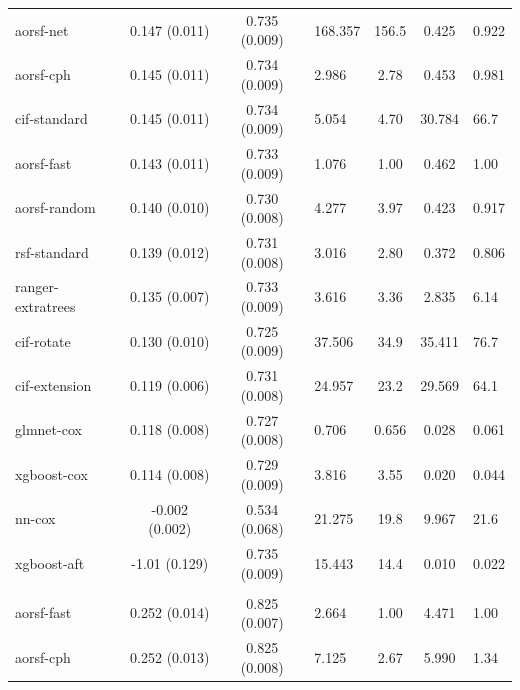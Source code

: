 \documentclass[twoside,11pt]{article}\usepackage[]{graphicx}\usepackage[]{xcolor}
\newenvironment{knitrout}{}{} %
\begin{document}
\begin{knitrout}
\begin{longtable}{lcclccl}
\hspace{1em}aorsf-net & 0.147 (0.011) & 0.735 (0.009) & 168.357 & 156.5 & 0.425 & 0.922\\
\hspace{1em}aorsf-cph & 0.145 (0.011) & 0.734 (0.009) & 2.986 & 2.78 & 0.453 & 0.981\\
\hspace{1em}cif-standard & 0.145 (0.011) & 0.734 (0.009) & 5.054 & 4.70 & 30.784 & 66.7\\
\hspace{1em}aorsf-fast & 0.143 (0.011) & 0.733 (0.009) & 1.076 & 1.00 & 0.462 & 1.00\\
\hspace{1em}aorsf-random & 0.140 (0.010) & 0.730 (0.008) & 4.277 & 3.97 & 0.423 & 0.917\\
\hspace{1em}rsf-standard & 0.139 (0.012) & 0.731 (0.008) & 3.016 & 2.80 & 0.372 & 0.806\\
\hspace{1em}ranger-extratrees & 0.135 (0.007) & 0.733 (0.009) & 3.616 & 3.36 & 2.835 & 6.14\\
\hspace{1em}cif-rotate & 0.130 (0.010) & 0.725 (0.009) & 37.506 & 34.9 & 35.411 & 76.7\\
\hspace{1em}cif-extension & 0.119 (0.006) & 0.731 (0.008) & 24.957 & 23.2 & 29.569 & 64.1\\
\hspace{1em}glmnet-cox & 0.118 (0.008) & 0.727 (0.008) & 0.706 & 0.656 & 0.028 & 0.061\\
\hspace{1em}xgboost-cox & 0.114 (0.008) & 0.729 (0.009) & 3.816 & 3.55 & 0.020 & 0.044\\
\hspace{1em}nn-cox & -0.002 (0.002) & 0.534 (0.068) & 21.275 & 19.8 & 9.967 & 21.6\\
\hspace{1em}xgboost-aft & -1.01 (0.129) & 0.735 (0.009) & 15.443 & 14.4 & 0.010 & 0.022\\
\addlinespace[0.3em]
\hline
\multicolumn{7}{l}{\textit{\textbf{Serum free light chain; death, n = 7874, p = 10}}}\\
\hline
\hspace{1em}aorsf-fast & 0.252 (0.014) & 0.825 (0.007) & 2.664 & 1.00 & 4.471 & 1.00\\
\hspace{1em}aorsf-cph & 0.252 (0.013) & 0.825 (0.008) & 7.125 & 2.67 & 5.990 & 1.34\\

\end{longtable}
\end{knitrout}
\end{document}

